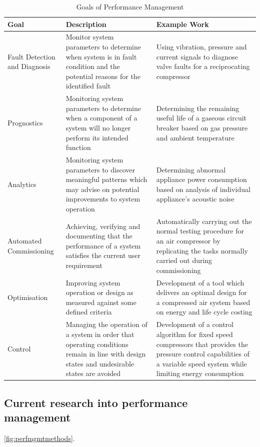 \begin{table}
  \centering
  \caption{Goals of Performance Management}
    \begin{tabular}{p{.3\linewidth}p{.3\linewidth}p{.3\linewidth}}
    \toprule
    Goal  & Description & Example Work \\
    \midrule
    Fault Detection and Diagnosis & Monitor system parameters to determine when system is in fault condition and the potential reasons for the identified fault & Using vibration, pressure and current signals to diagnose valve faults for a reciprocating compressor \cite{Tran2014} \\
    Prognostics & Monitoring system parameters to determine when a component of a system will no longer perform its intended function \cite{Vachtsevanos2006} & Determining the remaining useful life of a gaseous circuit breaker  based on gas pressure and ambient temperature \cite{Catterson2013} \\
    Analytics & Monitoring system parameters to discover meaningful patterns which may advise on potential improvements to system operation & Determining abnormal appliance power consumption based on analysis of individual appliance’s acoustic noise \cite{Pathak2015} \\
    Automated Commissioning & Achieving, verifying and documenting that the performance of a system satisfies the current user requirement & Automatically carrying out the normal testing procedure for an air compressor by replicating the tasks normally carried out during commissioning \cite{Mazid2008} \\
    Optimisation & Improving system operation or design as measured against some defined criteria & Development of a tool which delivers an optimal design for a compressed air system based on energy and life cycle costing \cite{Friden2012} \\
    Control & Managing the operation of a system in order that operating conditions remain in line with design states and undesirable states are avoided & Development of a control algorithm for fixed speed compressors that provides the pressure control capabilities of a variable speed system while limiting energy consumption \cite{Facchinetti} \\
    \bottomrule
    \end{tabular}%
  \label{tab:goalsmgmt}%
\end{table}%

\subsection{Current research into performance management}
\label{subsec:perfmgmtmethods}
\autoref{fig:perfmgmtmethods}.

